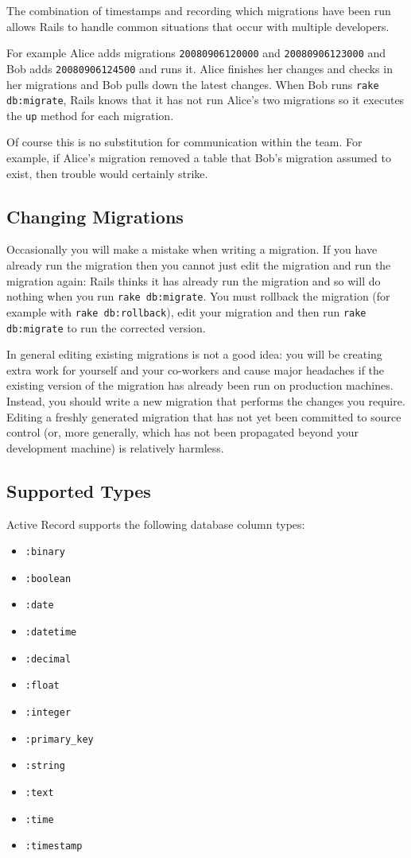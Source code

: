 \documentclass[10pt]{book}
\begin{document}
The combination of timestamps and recording which migrations have been run allows Rails to handle common situations that occur with multiple developers.

For example Alice adds migrations \texttt{20080906120000} and \texttt{20080906123000} and Bob adds \texttt{20080906124500} and runs it. Alice finishes her changes and checks in her migrations and Bob pulls down the latest changes. When Bob runs \texttt{rake db:migrate}, Rails knows that it has not run Alice’s two migrations so it executes the \texttt{up} method for each migration.

Of course this is no substitution for communication within the team. For example, if Alice’s migration removed a table that Bob’s migration assumed to exist, then trouble would certainly strike.

\subsection{ Changing Migrations}

Occasionally you will make a mistake when writing a migration. If you have already run the migration then you cannot just edit the migration and run the migration again: Rails thinks it has already run the migration and so will do nothing when you run \texttt{rake db:migrate}. You must rollback the migration (for example with \texttt{rake db:rollback}), edit your migration and then run \texttt{rake db:migrate} to run the corrected version.

In general editing existing migrations is not a good idea: you will be creating extra work for yourself and your co-workers and cause major headaches if the existing version of the migration has already been run on production machines. Instead, you should write a new migration that performs the changes you require. Editing a freshly generated migration that has not yet been committed to source control (or, more generally, which has not been propagated beyond your development machine) is relatively harmless.

\subsection{ Supported Types}

Active Record supports the following database column types:
\begin{itemize}
	\item \texttt{:binary}
	\item \texttt{:boolean}
	\item \texttt{:date}
	\item \texttt{:datetime}
	\item \texttt{:decimal}
	\item \texttt{:float}
	\item \texttt{:integer}
	\item \texttt{:primary\_key}
	\item \texttt{:string}
	\item \texttt{:text}
	\item \texttt{:time}
	\item \texttt{:timestamp}
\end{itemize}
\end{document}

